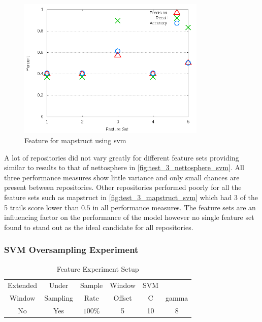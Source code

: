 \begin{figure}[!ht]
    \centering
        \includegraphics[width=0.8\textwidth]{images/svm/test_3/mapstruct_sample_range}
        \caption{Feature for mapstruct using \gls{svm}}
        \label{fig:test_3_mapstruct_svm}
\end{figure}

A lot of repositories did not vary greatly for different feature sets providing similar to results to that of nettosphere in \autoref{fig:test_3_nettosphere_svm}. All three performance measures show little variance and only small chances are present between repositories. Other repositories performed poorly for all the feature sets such as mapstruct in \autoref{fig:test_3_mapstruct_svm} which had 3 of the 5 trails score lower than $0.5$ in all performance measures. The feature sets are an influencing factor on the performance of the model however no single feature set found to stand out as the ideal candidate for all repositories.

\subsubsection{SVM Oversampling Experiment}
\label{sec:svm_os_experiment}

\begin{table}[h]
\begin{center}

    \begin{tabular}{|c|c|c|c|cc|}
        \hline
        Extended & Under & Sample & Window & SVM & \\
        Window & Sampling & Rate & Offset &  C & gamma \\ \hline
        No & Yes & $100\%$ & 5 & 10 & 8 \\ \hline
    \end{tabular}
    \caption{Feature Experiment Setup}
    \label{tab:rf_feature_experiment_3_setup}
\end{center}

\end{table}


